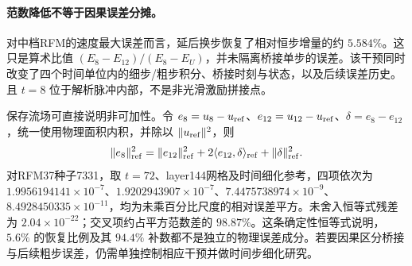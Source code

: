 \paragraph{范数降低不等于因果误差分摊。}
对中档RFM的速度最大误差而言，延后换步恢复了相对恒步增量的约 $5.584\%$。这只是算术比值 $(E_8-E_{12})/(E_8-E_U)$，并未隔离桥接单步的误差。该干预同时改变了四个时间单位内的细步/粗步积分、桥接时刻与状态，以及后续误差历史。且 $t=8$ 位于解析脉冲内部，不是非光滑激励拼接点。

保存流场可直接说明非可加性。令 $e_8=u_8-u_{\rm ref}$、$e_{12}=u_{12}-u_{\rm ref}$、$\delta=e_8-e_{12}$，统一使用物理面积内积，并除以 $\|u_{\rm ref}\|^2$，则
\begin{equation}
 \|e_8\|_{\rm ref}^2=\|e_{12}\|_{\rm ref}^2+
 2\langle e_{12},\delta\rangle_{\rm ref}+\|\delta\|_{\rm ref}^2.
 \label{eq:review-switch-attribution}
\end{equation}
对RFM37种子7331，取 $t=72$、layer144网格及时间细化参考，四项依次为 $1.9956194141\times10^{-7}$、$1.9202943907\times10^{-7}$、$7.4475738974\times10^{-9}$、$8.4928450335\times10^{-11}$，均为未乘百分比尺度的相对误差平方。未舍入恒等式残差为 $2.04\times10^{-22}$；交叉项约占平方范数差的 $98.87\%$。这条确定性恒等式说明，$5.6\%$ 的恢复比例及其 $94.4\%$ 补数都不是独立的物理误差成分。若要因果区分桥接与后续粗步误差，仍需单独控制相应干预并做时间步细化研究。
